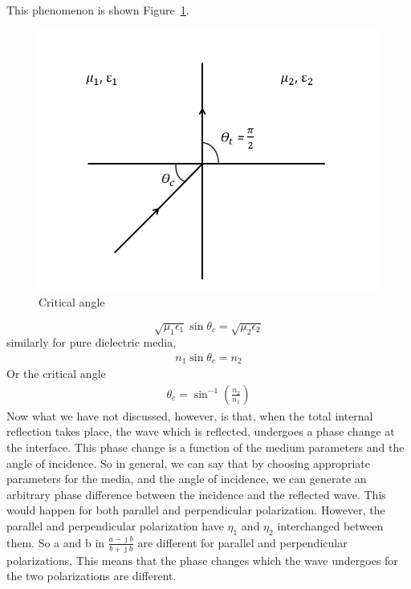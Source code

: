 \begin{enumerate}[(i)]
This phenomenon is shown Figure~\ref {critical_angle}.
\begin{figure}[h]
\centering
\includegraphics[width=1\linewidth]{./graphics/critical_angle}
\caption{Critical angle}
\label{critical_angle}
\end{figure}

\begin{equation*}
\sqrt{\mu_1\epsilon_1} \sin\theta_c = \sqrt{\mu_2\epsilon_2}
\end{equation*}
similarly for pure dielectric media, 
\begin{align*}
n_1 \sin\theta_c = n_2
\end{align*}
Or the critical angle
\begin{align*}
\theta_c = \sin^{-1}(\frac{n_2}{n_1}) 
\end{align*}
Now what we have not discussed, however, is that, when the total internal reflection takes place, the wave which is reflected, undergoes a phase change at the interface. This phase change is a function of the medium parameters and the angle of incidence. So in general, we can say that by choosing appropriate parameters for the media, and the angle of incidence, we can generate an arbitrary phase difference between the incidence and the reflected wave. This would happen for both parallel and perpendicular polarization. However, the parallel and perpendicular polarization have $\eta_1$ and $\eta_2$
interchanged between them. So a and b in $\frac{a - \jmath b}{b + \jmath b}$ are different for parallel and perpendicular polarizations. This means that the phase changes which the wave undergoes for the two polarizations are different.


\end{enumerate}

